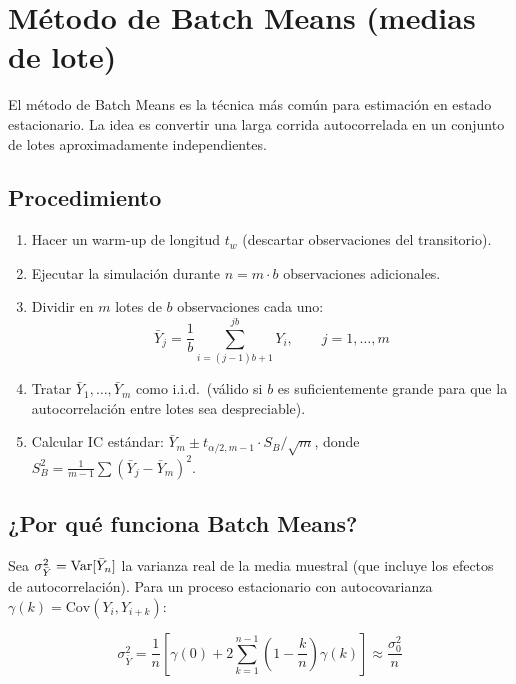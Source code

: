 \documentclass[11pt, letterpaper]{article}
\begin{document}
\section{Método de Batch Means (medias de lote)}

El método de Batch Means es la técnica más común para estimación en estado estacionario. La idea es convertir una larga corrida autocorrelada en un conjunto de lotes aproximadamente independientes.

\subsection{Procedimiento}

\begin{metodobox}
\begin{enumerate}
    \item Hacer un warm-up de longitud $t_w$ (descartar observaciones del transitorio).
    \item Ejecutar la simulación durante $n = m \cdot b$ observaciones adicionales.
    \item Dividir en $m$ lotes de $b$ observaciones cada uno:
    \[
    \bar Y_j = \frac{1}{b}\sum_{i=(j-1)b+1}^{jb} Y_i, \qquad j = 1,\ldots,m
    \]
    \item Tratar $\bar Y_1,\ldots,\bar Y_m$ como i.i.d.\ (válido si $b$ es suficientemente grande para que la autocorrelación entre lotes sea despreciable).
    \item Calcular IC estándar: $\bar Y_m \pm t_{\alpha/2,m-1}\cdot S_B/\sqrt{m}$, donde $S_B^2 = \frac{1}{m-1}\sum(\bar Y_j - \bar Y_m)^2$.
\end{enumerate}
\end{metodobox}

\subsection{¿Por qué funciona Batch Means?}

Sea $\sigma_{\bar Y}^2 = \operatorname{Var}[\bar Y_n]$ la varianza real de la media muestral (que incluye los efectos de autocorrelación). Para un proceso estacionario con autocovarianza $\gamma(k) = \text{Cov}(Y_i, Y_{i+k})$:

\[
\sigma_{\bar Y}^2 = \frac{1}{n}\left[\gamma(0) + 2\sum_{k=1}^{n-1}\left(1-\frac{k}{n}\right)\gamma(k)\right] \approx \frac{\sigma_0^2}{n}
\]
\end{document}
